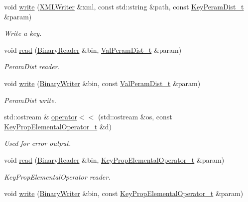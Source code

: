 \begin{DoxyCompactItemize}
void \mbox{\hyperlink{namespaceHadron_a9d260315c8fc49d172ff22fd3abb49c9}{write}} (\mbox{\hyperlink{classADATXML_1_1XMLWriter}{X\+M\+L\+Writer}} \&xml, const std\+::string \&path, const \mbox{\hyperlink{structHadron_1_1KeyPeramDist__t}{Key\+Peram\+Dist\+\_\+t}} \&param)
\begin{DoxyCompactList}\small\item\em Write a key. \end{DoxyCompactList}\item 
void \mbox{\hyperlink{namespaceHadron_a030f71bff6ae10166b42e24845e0dbf8}{read}} (\mbox{\hyperlink{classADATIO_1_1BinaryReader}{Binary\+Reader}} \&bin, \mbox{\hyperlink{structHadron_1_1ValPeramDist__t}{Val\+Peram\+Dist\+\_\+t}} \&param)
\begin{DoxyCompactList}\small\item\em Peram\+Dist reader. \end{DoxyCompactList}\item 
void \mbox{\hyperlink{namespaceHadron_afebbe26d622d0f830042509739bee2da}{write}} (\mbox{\hyperlink{classADATIO_1_1BinaryWriter}{Binary\+Writer}} \&bin, const \mbox{\hyperlink{structHadron_1_1ValPeramDist__t}{Val\+Peram\+Dist\+\_\+t}} \&param)
\begin{DoxyCompactList}\small\item\em Peram\+Dist write. \end{DoxyCompactList}\item 
std\+::ostream \& \mbox{\hyperlink{namespaceHadron_a8fafc13cc7955fdf6c70c8c72c7b0000}{operator$<$$<$}} (std\+::ostream \&os, const \mbox{\hyperlink{structHadron_1_1KeyPropElementalOperator__t}{Key\+Prop\+Elemental\+Operator\+\_\+t}} \&d)
\begin{DoxyCompactList}\small\item\em Used for error output. \end{DoxyCompactList}\item 
void \mbox{\hyperlink{namespaceHadron_ac7fbe05fdb59de181eed9428364667e3}{read}} (\mbox{\hyperlink{classADATIO_1_1BinaryReader}{Binary\+Reader}} \&bin, \mbox{\hyperlink{structHadron_1_1KeyPropElementalOperator__t}{Key\+Prop\+Elemental\+Operator\+\_\+t}} \&param)
\begin{DoxyCompactList}\small\item\em Key\+Prop\+Elemental\+Operator reader. \end{DoxyCompactList}\item 
void \mbox{\hyperlink{namespaceHadron_a2d77dd144d88ef6a060cca397fb32373}{write}} (\mbox{\hyperlink{classADATIO_1_1BinaryWriter}{Binary\+Writer}} \&bin, const \mbox{\hyperlink{structHadron_1_1KeyPropElementalOperator__t}{Key\+Prop\+Elemental\+Operator\+\_\+t}} \&param)

\end{DoxyCompactItemize}
